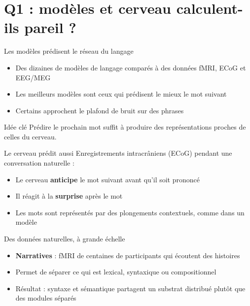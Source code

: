 \section{Q1 : modèles et cerveau calculent-ils pareil ?}

\begin{frame}{Les modèles prédisent le réseau du langage}
\begin{itemize}
    \item Des dizaines de modèles de langage comparés à des données fMRI, ECoG et EEG/MEG
    \item Les meilleurs modèles sont ceux qui prédisent le mieux le mot suivant
    \item Certains approchent le plafond de bruit sur des phrases
\end{itemize}
\vspace{0.5em}
\begin{block}{Idée clé}
    Prédire le prochain mot suffit à produire des représentations proches de celles du cerveau.
\end{block}
\end{frame}

\begin{frame}{Le cerveau prédit aussi}
Enregistrements intracrâniens (ECoG) pendant une conversation naturelle :
\begin{itemize}
    \item Le cerveau \textbf{anticipe} le mot suivant avant qu'il soit prononcé
    \item Il réagit à la \textbf{surprise} après le mot
    \item Les mots sont représentés par des plongements contextuels, comme dans un modèle
\end{itemize}
\end{frame}

\begin{frame}{Des données naturelles, à grande échelle}
\begin{itemize}
    \item \textbf{Narratives} : fMRI de centaines de participants qui écoutent des histoires
    \item Permet de séparer ce qui est lexical, syntaxique ou compositionnel
    \item Résultat : syntaxe et sémantique partagent un substrat distribué plutôt que des modules séparés
\end{itemize}
\end{frame}

